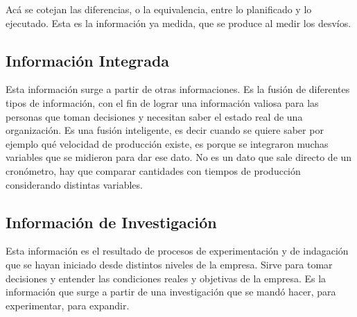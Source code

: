 Acá se cotejan las diferencias, o la equivalencia, entre lo planificado
y lo ejecutado. Esta es la información ya medida, que se produce al
medir los desvíos.

\hypertarget{informaciuxf3n-integrada}{%
\subsection{Información Integrada}\label{informaciuxf3n-integrada}}

Esta información surge a partir de otras informaciones. Es la fusión de
diferentes tipos de información, con el fin de lograr una información
valiosa para las personas que toman decisiones y necesitan saber el
estado real de una organización. Es una fusión inteligente, es decir
cuando se quiere saber por ejemplo qué velocidad de producción existe,
es porque se integraron muchas variables que se midieron para dar ese
dato. No es un dato que sale directo de un cronómetro, hay que comparar
cantidades con tiempos de producción considerando distintas variables.

\hypertarget{informaciuxf3n-de-investigaciuxf3n}{%
\subsection{Información de
Investigación}\label{informaciuxf3n-de-investigaciuxf3n}}

Esta información es el resultado de procesos de experimentación y de
indagación que se hayan iniciado desde distintos niveles de la empresa.
Sirve para tomar decisiones y entender las condiciones reales y
objetivas de la empresa. Es la información que surge a partir de una
investigación que se mandó hacer, para experimentar, para expandir.

\onecolumn
